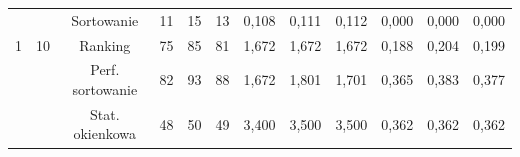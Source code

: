 \documentclass[magisterska]{pracamgr}
\begin{document}
\begin{table}[H]
{\begin{tabular}{@{}cccccccccccc@{}}
                                                               &                                                        & Sortowanie    & 11                                                     & 15                                                     & 13                                                        & 0,108                                                     & 0,111                                                      & 0,112                                                         & 0,000                                                              & 0,000                                                               & 0,000                                                                 \\
1                                                              & 10                                                     & Ranking    & 75                                                     & 85                                                     & 81                                                        & 1,672                                                     & 1,672                                                      & 1,672                                                         & 0,188                                                              & 0,204                                                               & 0,199                                                                 \\
                                                               &                                                        & Perf. sortowanie    & 82                                                     & 93                                                     & 88                                                        & 1,672                                                     & 1,801                                                      & 1,701                                                         & 0,365                                                              & 0,383                                                               & 0,377                                                                 \\
                                                               &                                                        & Stat. okienkowa    & 48                                                     & 50                                                     & 49                                                        & 3,400                                                     & 3,500                                                      & 3,500                                                         & 0,362                                                              & 0,362                                                               & 0,362                                                                 \\ \midrule

\end{tabular}}
\end{table}
\end{document}
